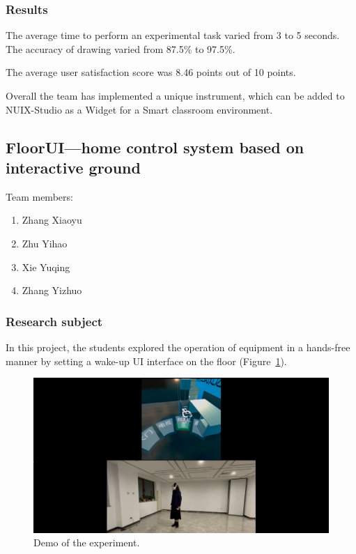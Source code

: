 \subsubsection{Results}

The average time to perform an experimental task varied from 3 to 5 seconds. The accuracy of drawing varied from 87.5\% to 97.5\%.

The average user satisfaction score was 8.46 points out of 10 points.

Overall the team has implemented a unique instrument, which can be added to NUIX-Studio as a Widget for a Smart classroom environment.

\subsection{FloorUI—home control system based on interactive ground}

Team members:
\begin{enumerate}
    \item Zhang Xiaoyu
    \item Zhu Yihao
    \item Xie Yuqing
    \item Zhang Yizhuo
\end{enumerate}


\subsubsection{Research subject}

In this project, the students explored the operation of equipment in a hands-free manner by setting a wake-up UI interface on the floor (Figure~\ref{fig:Project11-figure}). 

\begin{figure}
  \centering
  \includegraphics[width=0.9\linewidth]{figures/Project_11.png}
  \caption{Demo of the experiment.}
  \label{fig:Project11-figure}
\end{figure}

